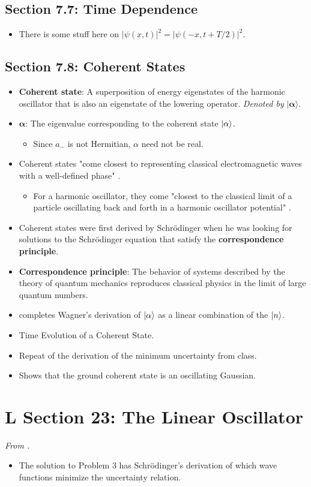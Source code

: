 \documentclass[../notes.tex]{subfiles}
\begin{document}
\subsection*{Section 7.7: Time Dependence}
\begin{itemize}
    \item There is some stuff here on $|\psi(x,t)|^2=|\psi(-x,t+T/2)|^2$.
\end{itemize}


\subsection*{Section 7.8: Coherent States}
\begin{itemize}
    \item \textbf{Coherent state}: A superposition of energy eigenstates of the harmonic oscillator that is also an eigenstate of the lowering operator. \emph{Denoted by} $\bm{|\alpha\rangle}$.
    \item $\bm{\alpha}$: The eigenvalue corresponding to the coherent state $\ket{\alpha}$.
    \begin{itemize}
        \item Since $a_-$ is not Hermitian, $\alpha$ need not be real.
    \end{itemize}
    \item Coherent states "come closest to representing classical electromagnetic waves with a well-defined phase" \parencite[263]{bib:Townsend}.
    \begin{itemize}
        \item For a harmonic oscillator, they come "closest to the classical limit of a particle oscillating back and forth in a harmonic oscillator potential" \parencite[263]{bib:Townsend}.
    \end{itemize}
    \item Coherent states were first derived by Schr\"{o}dinger when he was looking for solutions to the Schr\"{o}dinger equation that satisfy the \textbf{correspondence principle}.
    \item \textbf{Correspondence principle}: The behavior of systems described by the theory of quantum mechanics reproduces classical physics in the limit of large quantum numbers.
    \item \textcite{bib:Townsend} completes Wagner's derivation of $\ket{\alpha}$ as a linear combination of the $\ket{n}$.
    \item Time Evolution of a Coherent State.
    \item Repeat of the derivation of the minimum uncertainty from class.
    \item Shows that the ground coherent state is an oscillating Gaussian.
\end{itemize}



\section{L Section 23: The Linear Oscillator}
\emph{From \textcite{bib:Landau}.}
\begin{itemize}
    \item The solution to Problem 3 has Schr\"{o}dinger's derivation of which wave functions minimize the uncertainty relation.
\end{itemize}
\end{document}
